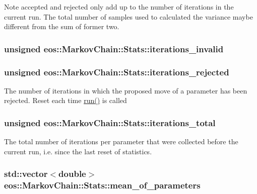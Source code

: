 \begin{DoxyNote}{Note}
accepted and rejected only add up to the number of iterations in the current run. The total number of samples used to calculated the variance maybe different from the sum of former two. 
\end{DoxyNote}
\hypertarget{structeos_1_1MarkovChain_1_1Stats_a42f68b2f84a5b2e3190529b9d8449e0e}{
\subsubsection[{iterations\_\-invalid}]{\setlength{\rightskip}{0pt plus 5cm}unsigned {\bf eos::MarkovChain::Stats::iterations\_\-invalid}}}
\label{structeos_1_1MarkovChain_1_1Stats_a42f68b2f84a5b2e3190529b9d8449e0e}
\hypertarget{structeos_1_1MarkovChain_1_1Stats_a61fc40a3cbb379e8ebc57b11eb388514}{
\subsubsection[{iterations\_\-rejected}]{\setlength{\rightskip}{0pt plus 5cm}unsigned {\bf eos::MarkovChain::Stats::iterations\_\-rejected}}}
\label{structeos_1_1MarkovChain_1_1Stats_a61fc40a3cbb379e8ebc57b11eb388514}
The number of iterations in which the proposed move of a parameter has been rejected. Reset each time \hyperlink{classeos_1_1MarkovChain_abc73ca1b9fc5bdafba43c799e75192c8}{run()} is called \hypertarget{structeos_1_1MarkovChain_1_1Stats_a0917e5acbc58e7b9fbe0c478b95e26ac}{
\subsubsection[{iterations\_\-total}]{\setlength{\rightskip}{0pt plus 5cm}unsigned {\bf eos::MarkovChain::Stats::iterations\_\-total}}}
\label{structeos_1_1MarkovChain_1_1Stats_a0917e5acbc58e7b9fbe0c478b95e26ac}
The total number of iterations per parameter that were collected before the current run, i.e. since the last reset of statistics. \hypertarget{structeos_1_1MarkovChain_1_1Stats_a43a0dbf5329e74fc9eef0cd7f5b28641}{
\subsubsection[{mean\_\-of\_\-parameters}]{\setlength{\rightskip}{0pt plus 5cm}std::vector$<$double$>$ {\bf eos::MarkovChain::Stats::mean\_\-of\_\-parameters}}}
\label{structeos_1_1MarkovChain_1_1Stats_a43a0dbf5329e74fc9eef0cd7f5b28641}



